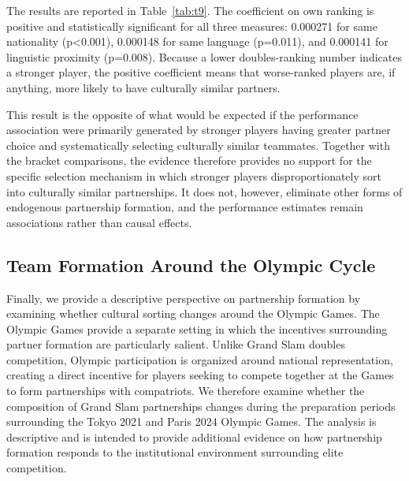 \documentclass[10pt]{article}
\begin{document}
The results are reported in Table~\ref{tab:t9}. The coefficient on own ranking is positive and statistically significant for all three measures: 0.000271 for same nationality (p<0.001), 0.000148 for same language (p=0.011), and 0.000141 for linguistic proximity (p=0.008). Because a lower doubles-ranking number indicates a stronger player, the positive coefficient means that worse-ranked players are, if anything, more likely to have culturally similar partners.

This result is the opposite of what would be expected if the performance association were primarily generated by stronger players having greater partner choice and systematically selecting culturally similar teammates. Together with the bracket comparisons, the evidence therefore provides no support for the specific selection mechanism in which stronger players disproportionately sort into culturally similar partnerships. It does not, however, eliminate other forms of endogenous partnership formation, and the performance estimates remain associations rather than causal effects.

\subsection{Team Formation Around the Olympic Cycle}

Finally, we provide a  descriptive perspective on partnership formation by examining whether cultural sorting changes around the Olympic Games. The Olympic Games provide a separate setting in which the incentives surrounding partner formation are particularly salient. Unlike Grand Slam doubles competition, Olympic participation is organized around national representation, creating a direct incentive for players seeking to compete together at the Games to form partnerships with compatriots. We therefore examine whether the composition of Grand Slam partnerships changes during the preparation periods surrounding the Tokyo 2021 and Paris 2024 Olympic Games. The analysis is descriptive and is intended to provide additional evidence on how partnership formation responds to the institutional environment surrounding elite competition.
\end{document}
